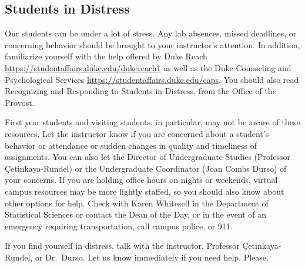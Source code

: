 \documentclass[
]{article}
\begin{document}
\hypertarget{students-in-distress}{%
\subsection{Students in Distress}\label{students-in-distress}}

Our students can be under a lot of stress. Any lab absences, missed deadlines, or concerning behavior should be brought to your instructor's attention. In addition, familiarize yourself with the help offered by Duke Reach \url{https://studentaffairs.duke.edu/dukereach1} as well as the Duke Counseling and Psychological Services \url{https://studentaffairs.duke.edu/caps}. You should also read Recognizing and Responding to Students in Distress, from the Office of the Provost.

First year students and visiting students, in particular, may not be aware of these resources. Let the instructor know if you are concerned about a student's behavior or attendance or sudden changes in quality and timeliness of assignments. You can also let the Director of Undergraduate Studies (Professor Çetinkaya-Rundel) or the Undergraduate Coordinator (Joan Combs Durso) of your concerns. If you are holding office hours on nights or weekends, virtual campus resources may be more lightly staffed, so you should also know about other options for help. Check with Karen Whitesell in the Department of Statistical Sciences or contact the Dean of the Day, or in the event of an emergency requiring transportation, call campus police, or 911.

If you find yourself in distress, talk with the instructor, Professor Çetinkaya-Rundel, or Dr.~Durso. Let us know immediately if you need help. Please.

  
\end{document}
